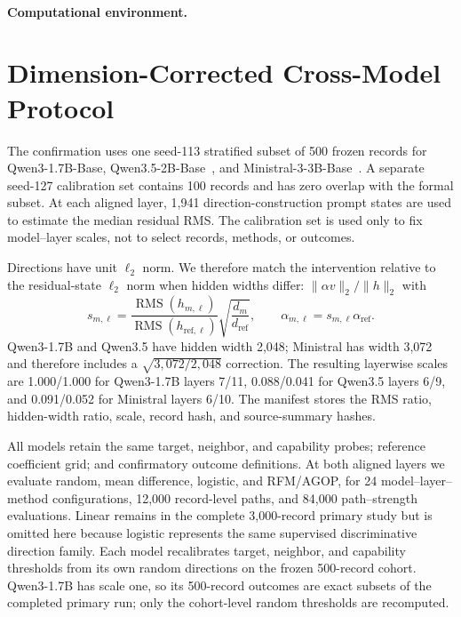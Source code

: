 \paragraph{Computational environment.}




\section{Dimension-Corrected Cross-Model Protocol}

The confirmation uses one seed-113 stratified subset of 500 frozen records for
Qwen3-1.7B-Base, Qwen3.5-2B-Base~\cite{qwen2026qwen35}, and
Ministral-3-3B-Base~\cite{liu2026ministral3}. A separate seed-127
calibration set contains 100 records and has zero overlap with the formal
subset. At each aligned layer, 1,941 direction-construction prompt states are
used to estimate the median residual RMS. The calibration set is used only to
fix model--layer scales, not to select records, methods, or outcomes.

Directions have unit $\ell_2$ norm. We therefore match the intervention
relative to the residual-state $\ell_2$ norm when hidden widths differ:
$\|\alpha v\|_2/\|h\|_2$ with
\begin{equation}
    s_{m,\ell}=\frac{\operatorname{RMS}(h_{m,\ell})}
    {\operatorname{RMS}(h_{\mathrm{ref},\ell})}
    \sqrt{\frac{d_m}{d_{\mathrm{ref}}}},
    \qquad \alpha_{m,\ell}=s_{m,\ell}\alpha_{\mathrm{ref}}.
    \label{eq:supp-rms-matching}
\end{equation}
Qwen3-1.7B and
Qwen3.5 have hidden width 2,048; Ministral has width 3,072 and therefore
includes a $\sqrt{3{,}072/2{,}048}$ correction. The resulting layerwise scales
are 1.000/1.000 for Qwen3-1.7B layers 7/11, 0.088/0.041 for Qwen3.5 layers
6/9, and 0.091/0.052 for Ministral layers 6/10. The manifest stores the RMS
ratio, hidden-width ratio, scale, record hash, and source-summary hashes.

All models retain the same target, neighbor, and capability probes; reference
coefficient grid; and confirmatory outcome definitions. At both aligned layers
we evaluate random, mean difference, logistic, and RFM/AGOP, for 24
model--layer--method configurations, 12,000 record-level paths, and 84,000
path--strength evaluations. Linear remains in the complete 3,000-record primary
study but is omitted here because logistic represents the same supervised
discriminative direction family. Each model recalibrates target, neighbor, and
capability thresholds from its own random directions on the frozen 500-record
cohort. Qwen3-1.7B has scale one, so its 500-record outcomes are exact subsets
of the completed primary run; only the cohort-level random thresholds are
recomputed.


